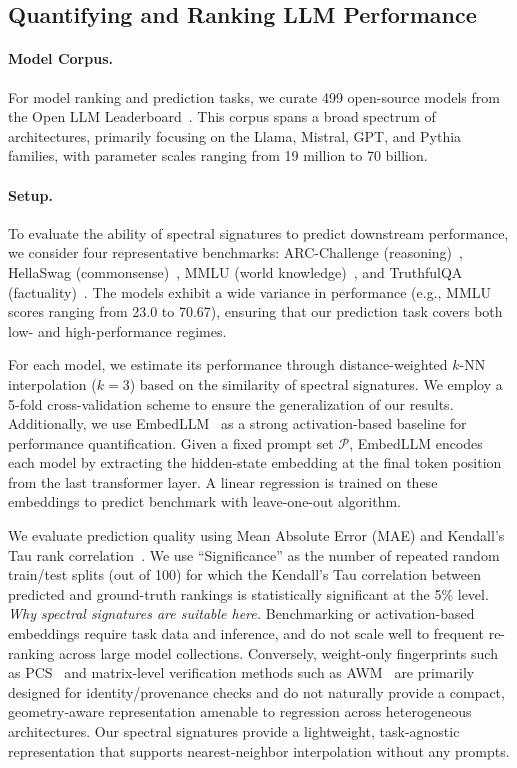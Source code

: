 \subsection{Quantifying and Ranking LLM Performance}
\label{sec:results_eval_performance}

\paragraph{Model Corpus.} For model ranking and prediction tasks, we curate 499 open-source models from the Open LLM Leaderboard~\cite{myrzakhan2024openllmleaderboard}. This corpus spans a broad spectrum of architectures, primarily focusing on the Llama, Mistral, GPT, and Pythia families, with parameter scales ranging from 19 million to 70 billion.
 
\paragraph{Setup.} 
To evaluate the ability of spectral signatures to predict downstream performance, we consider four representative benchmarks: ARC-Challenge (reasoning)~\cite{clark2018thinksolvedquestionanswering}, HellaSwag (commonsense)~\cite{zellers-etal-2019-hellaswag}, MMLU (world knowledge)~\cite{hendrycks2021measuring}, and TruthfulQA (factuality)~\cite{lin-etal-2022-truthfulqa}. The models exhibit a wide variance in performance (e.g., MMLU scores ranging from 23.0 to 70.67), ensuring that our prediction task covers both low- and high-performance regimes. 

For each model, we estimate its performance through distance-weighted $k$-NN interpolation ($k=3$) based on the similarity of spectral signatures. We employ a 5-fold cross-validation scheme to ensure the generalization of our results. 
Additionally, we use EmbedLLM~\cite{zhuang2025embedllm} as a strong activation-based baseline for performance quantification. Given a fixed prompt set $\mathcal{P}$, EmbedLLM encodes each model by extracting the hidden-state embedding at the final token position from the last transformer layer. A linear regression is trained on these embeddings to predict benchmark with leave-one-out algorithm. 

We evaluate prediction quality using Mean Absolute Error (MAE) and Kendall’s Tau rank correlation~\cite{kendall1948rank}. We use ``Significance'' as the number of repeated random train/test splits (out of 100) for which the Kendall’s Tau correlation between predicted and ground-truth rankings is statistically significant at the 5\% level.
%
\emph{Why spectral signatures are suitable here.} Benchmarking or activation-based embeddings require task data and inference, and do not scale well to frequent re-ranking across large model collections. Conversely, weight-only fingerprints such as \textsc{PCS}~\cite{zeng2024HuRef} and matrix-level verification methods such as \textsc{AWM}~\cite{zeng2025awm} are primarily designed for identity/provenance checks and do not naturally provide a compact, geometry-aware representation amenable to regression across heterogeneous architectures. Our spectral signatures provide a lightweight, task-agnostic representation that supports nearest-neighbor interpolation without any prompts.

